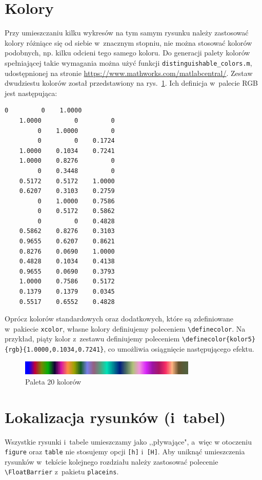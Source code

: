 \section{Kolory}
Przy umieszczaniu kilku wykresów na tym samym rysunku należy zastosować kolory różniące się od siebie w~znacznym stopniu, nie można stosować kolorów podobnych, np. kilku odcieni tego samego koloru. Do generacji palety kolorów spełniającej takie wymagania można użyć funkcji \verb+distinguishable_colors.m+, udostępnionej na stronie \url{https://www.mathworks.com/matlabcentral/}. Zestaw dwudziestu kolorów został przedstawiony na rys.~\ref{r_zestaw_kolorow}. Ich definicja w~palecie RGB jest następująca:
\begin{lstlisting}[style=customlatex,frame=single]
         0         0    1.0000
    1.0000         0         0
         0    1.0000         0
         0         0    0.1724
    1.0000    0.1034    0.7241
    1.0000    0.8276         0
         0    0.3448         0
    0.5172    0.5172    1.0000
    0.6207    0.3103    0.2759
         0    1.0000    0.7586
         0    0.5172    0.5862
         0         0    0.4828
    0.5862    0.8276    0.3103
    0.9655    0.6207    0.8621
    0.8276    0.0690    1.0000
    0.4828    0.1034    0.4138
    0.9655    0.0690    0.3793
    1.0000    0.7586    0.5172
    0.1379    0.1379    0.0345
    0.5517    0.6552    0.4828
\end{lstlisting}
Oprócz kolorów standardowych oraz dodatkowych, które są zdefiniowane w~pakiecie \verb+xcolor+, własne kolory definiujemy poleceniem \verb+\definecolor+. Na przykład, piąty kolor z~zestawu definiujemy poleceniem \verb+\definecolor{kolor5}{rgb}{1.0000,0.1034,0.7241}+, {\color{kolor5}co umożliwia osiągnięcie następującego efektu}.

\begin{figure}[b]
\centering
\includegraphics[width=0.75\textwidth,height=0.1\textheight]{rysunki/kolory}
\caption{Paleta 20 kolorów}
\label{r_zestaw_kolorow}
\end{figure}

\section{Lokalizacja rysunków (i~tabel)}
Wszystkie rysunki i~tabele umieszczamy jako ,,pływające", a~więc w otoczeniu \verb+figure+ oraz \verb+table+ nie stosujemy opcji \verb+[h]+ i~\verb+[H]+. Aby uniknąć umieszczenia rysunków w~tekście kolejnego rozdziału należy zastosować polecenie \verb+\FloatBarrier+ z~pakietu \verb+placeins+.


